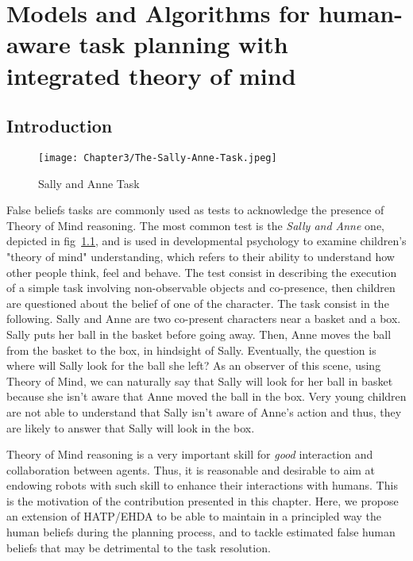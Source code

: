 \ifdefined{}
\else
\setcounter{chapter}{2} %
\dominitoc
\faketableofcontents
\fi

\chapter{Models and Algorithms for human-aware task planning with integrated theory of mind}
\label{chap:3}
\minitoc


\section{Introduction}



\begin{figure}
    \centering
    \texttt{[image: Chapter3/The-Sally-Anne-Task.jpeg]}
    \caption{Sally and Anne Task}
    \label{fig:sally_and_anne_task}
\end{figure}

False beliefs tasks are commonly used as tests to acknowledge the presence of Theory of Mind reasoning. The most common test is the \textit{Sally and Anne} one, depicted in fig~\ref{fig:sally_and_anne_task}, and is used in developmental psychology to examine children's "theory of mind" understanding, which refers to their ability to understand how other people think, feel and behave. The test consist in describing the execution of a simple task involving non-observable objects and co-presence, then children are questioned about the belief of one of the character. The task consist in the following. Sally and Anne are two co-present characters near a basket and a box. Sally puts her ball in the basket before going away. Then, Anne moves the ball from the basket to the box, in hindsight of Sally. Eventually, the question is where will Sally look for the ball she left? As an observer of this scene, using Theory of Mind, we can naturally say that Sally will look for her ball in basket because she isn't aware that Anne moved the ball in the box. Very young children are not able to understand that Sally isn't aware of Anne's action and thus, they are likely to answer that Sally will look in the box. 

Theory of Mind reasoning is a very important skill for \textit{good} interaction and collaboration between agents. Thus, it is reasonable and desirable to aim at endowing robots with such skill to enhance their interactions with humans. This is the motivation of the contribution presented in this chapter. Here, we propose an extension of HATP/EHDA to be able to maintain in a principled way the human beliefs during the planning process, and to tackle estimated false human beliefs that may be detrimental to the task resolution.

